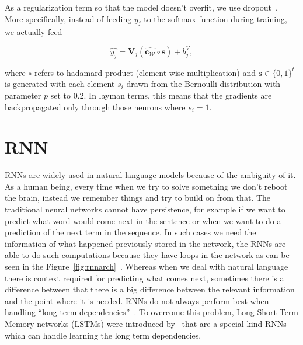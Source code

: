As a regularization term so that the model doesn't overfit, we use dropout~\cite{srivastava2014dropout}. More specifically, instead of feeding $y_j$ to the softmax function during training, we actually feed 

\[ \widehat{y_{j}} = \mathbf{V}_j( \mathbf{\widehat{c_{\mathcal{W}}}} \circ \mathbf{s}) + b^{V}_j,
\]
 
where $\circ$ refers to hadamard product (element-wise multiplication) and $\mathbf{s} \in \{0,1\}^t$ is generated with each element $s_i$ drawn from the Bernoulli distribution with parameter $p$ set to $0.2$. In layman terms, this means that the gradients are backpropagated only through those neurons where $s_i = 1$. 





\section{RNN}
RNNs are widely used in natural language models because of the ambiguity of it. As a human being, every time when we try to solve something we don't reboot the brain, instead we remember things and try to build on from that. The traditional neural networks cannot have persistence, for example if we want to predict what word would come next in the sentence or when we want to do a prediction of the next term in the sequence. In such cases we need the information of what happened previously stored in the network, the RNNs are able to do such computations because they have loops in the network as can be seen in the Figure~\ref{fig:rnnarch}~\cite{chung2015recurrent}. Whereas when we deal with natural language there is context required for predicting what comes next, sometimes there is a difference between that there is a big difference between the relevant information and the point where it is needed. RNNs do not always perform best when handling ``long term dependencies''~\cite{bengio1994learning}. To overcome this problem, Long Short Term Memory networks (LSTMs) were introduced by~\cite{hochreiter1997long} that are a special kind RNNs which can handle learning the long term dependencies. 

